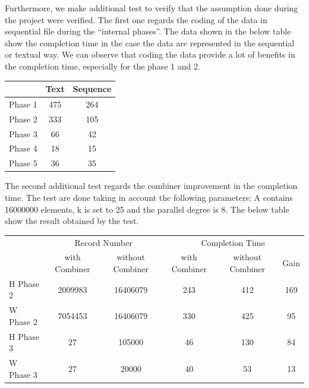 Furthermore, we make additional test to verify that the assumption done during the project were verified. The first one regards the coding of the data in sequential file during the ``internal phases''. The data shown in the below table show the completion time in the case the data are represented in the sequential or textual way. We can observe that coding the data provide a lot of benefits in the completion time, especially for the phase 1 and 2.

\begin{center}
\begin{tabular}{ | l || c | c | }
  \hline      
  & Text & Sequence \\
  \hline      
  Phase 1 & 475 & 264 \\
  Phase 2 & 333 & 105 \\
  Phase 3 & 66 & 42 \\ 
  Phase 4 & 18 & 15 \\
  Phase 5 & 36 & 35 \\
  \hline  
\end{tabular}
\end{center}

The second additional test regards the combiner improvement in the completion time. The test are done taking in account the following parameters: A contains 16000000 elements, k is set to 25 and the parallel degree is 8. The below table show the result obtained by the test.

\begin{center}

\begin{tabular}{ | l || c | c || c | c| c }
  \hline      
  & \multicolumn{2}{|c||}{Record Number} & \multicolumn{3}{|c|}{Completion Time} \\
  & with Combiner & without Combiner & with Combiner & without Combiner & Gain\\
  \hline      
  H Phase 2 & 2009983 & 16406079 & 243 & 412 & 169 \\
  W Phase 2 & 7054453 & 16406079 & 330 & 425 & 95 \\ 
  H Phase 3 & 27 & 105000 & 46 & 130 & 84 \\ 
  W Phase 3 & 27 & 20000 & 40 & 53 & 13 \\ 
 \hline  
\end{tabular}
\end{center}














